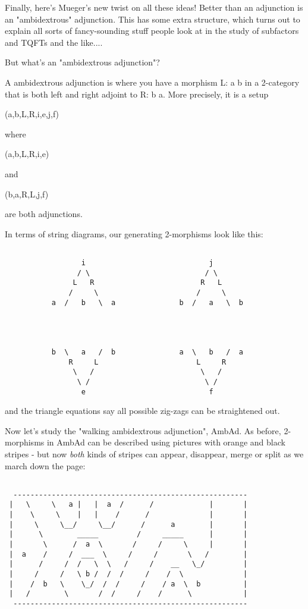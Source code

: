 Finally, here's Mueger's new twist on all these ideas!  Better than
an adjunction is an "ambidextrous" adjunction.  This has some
extra structure, which turns out to explain all sorts of fancy-sounding
stuff people look at in the study of subfactors and TQFTs and the
like....

But what's an "ambidextrous adjunction"?


 A ambidextrous adjunction is where you have a morphism
L: a \to  b
in a 2-category that is both left and right adjoint to 
R: b \to  a.
More precisely, it is a setup

(a,b,L,R,i,e,j,f) 

where 

(a,b,L,R,i,e) 

and

(b,a,R,L,j,f) 

are both adjunctions.  

In terms of string diagrams, our generating 2-morphisms look like this:




\begin{verbatim}

                  i                             j
                 / \                           / \
                L   R                         R   L
               /     \                       /     \
           a  /   b   \  a               b  /   a   \  b




           b  \   a   /  b               a  \   b   /  a
               R     L                       L     R
                \   /                         \   /
                 \ /                           \ /
                  e                             f
\end{verbatim}
    
and the triangle equations say all possible zig-zags can be straightened
out.

Now let's study the "walking ambidextrous adjunction",
AmbAd.  As before, 2-morphisms in AmbAd can be described using pictures
with orange and black stripes - but now \emph{both} kinds of stripes
can appear, disappear, merge or split as we march down the page:


\begin{verbatim}

  -------------------------------------------------------
 |   \     \   a |   |  a  /      /             |       |
 |    \     \    |   |    /      /              |       |
 |     \     \__/     \__/      /      a        |       |
 |      \        _____         /     _____      |       |
 |       \      /  a  \       /     /     \     |       |
 |  a    /     /  ___  \     /     /       \   /        |
 |      /     /  /   \  \   /     /    __   \_/         |
 |     /     /   \ b /  /  /     /    /  \              |
 |    /  b   \    \_/  /  /     /    / a  \  b          |
 |   /        \       /  /     /    /      \            |
  -------------------------------------------------------
\end{verbatim}
    

